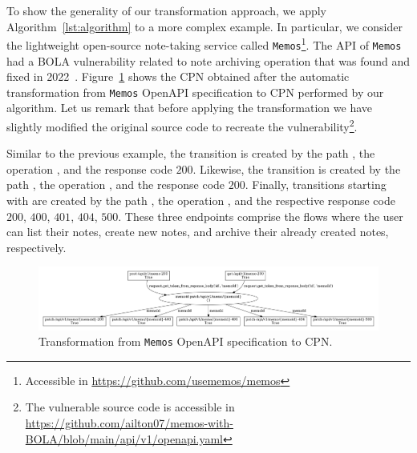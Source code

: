 To show the generality of our transformation approach, we apply Algorithm~\ref{lst:algorithm} to a more complex example. In particular, we consider the  lightweight open-source note-taking service called {\tt Memos}\footnote{Accessible in \url{https://github.com/usememos/memos}}. The API of {\tt Memos} had a BOLA vulnerability related to note archiving operation that was found and fixed in 2022~\cite{huntr2022}. Figure~\ref{fig:memos_inital_state} shows the CPN obtained after the automatic transformation from {\tt Memos} OpenAPI specification to CPN performed by our algorithm. Let us remark that before applying the transformation we have slightly modified the original source code to recreate the vulnerability\footnote{The vulnerable source code is accessible in \url{https://github.com/ailton07/memos-with-BOLA/blob/main/api/v1/openapi.yaml}}.

Similar to the previous example, the transition  is created by the path , the operation , and the response code $200$. Likewise, the transition  is created by the path , the operation , and the response code $200$. Finally, transitions starting with  are created by the path , the operation , and the respective response code $200$, $400$, $401$, $404$, $500$. These three endpoints comprise the flows where the user can list their notes, create new notes, and archive their already created notes, respectively.

\begin{figure}
    \center
    \includegraphics[width=2\columnwidth]{figures/memos-0-initial-state}
    \caption{Transformation from {\tt Memos} OpenAPI specification to CPN.}
    \label{fig:memos_inital_state}
\end{figure}
